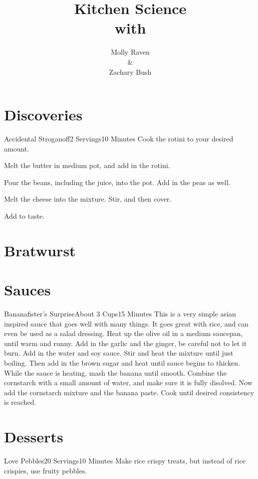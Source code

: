 \documentclass[a4paper]{book}
\title{Kitchen Science\\with}
\author{Molly Raven\\\&\\Zachary Bush}
\begin{document}
\maketitle
\tableofcontents
\chapter{Discoveries}
\begin{recipe}{Accidental Stroganoff}{2 Servings}{10 Minutes}
\freeform 
{}
Cook the rotini to your desired amount.

Melt the butter in medium pot, and add in the rotini. 

Pour the beans, including the juice, into the pot. Add in the peas as well. 

Melt the cheese into the mixture. Stir, and then cover.

Add to taste.
\end{recipe}
\chapter{Bratwurst}

\chapter{Sauces}
\begin{recipe}{Bananafister's Surprise}{About 3 Cups}{15 Minutes}
\freeform This is a very simple asian inspired sauce that goes well with many 
things. It goes great with rice, and can even be used as a salad dressing. 
Heat up the olive oil in a medium saucepan, until warm and runny. Add in the
garlic and the ginger, be careful not to let it burn.
Add in the water and soy sauce. Stir and heat the mixture until just boiling.
Then add in the brown sugar and heat until sauce begins to thicken. 
While the sauce is heating, mash the banana until smooth. Combine the cornstarch
with a small amount of water, and make sure it is fully disolved. Now add the
cornstarch mixture and the banana paste. Cook until desired consistency is
reached.
\end{recipe}
\chapter{Desserts}
\begin{recipe}{Love Pebbles}{20 Servings}{10 Minutes}
\freeform Make rice crispy treats, but instead of rice crispies, use fruity
pebbles.

\end{recipe}
\end{document}

